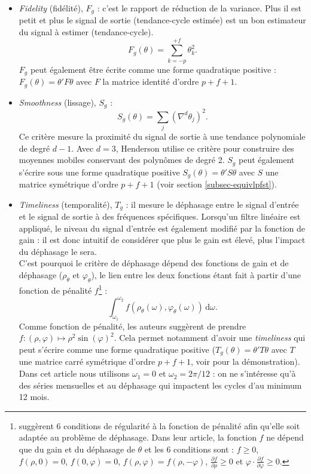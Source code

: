 \documentclass[
  12pt,
  french,
  12pt,a4paper]{article}
\newcommand\1{\mathds{1}}
\newcommand\ud{\,\mathrm{d}}
\begin{document}
\begin{itemize}
\item
  \emph{Fidelity} (fidélité), \(F_g\) : c'est le rapport de réduction de la variance.
  Plus il est petit et plus le signal de sortie (tendance-cycle estimée) est un bon estimateur du signal à estimer (tendance-cycle).
  \[
  F_g(\theta) = \sum_{k=-p}^{+f}\theta_{k}^{2}.
  \]
  \(F_g\) peut également être écrite comme une forme quadratique positive : \(F_g(\theta)=\theta'F\theta\) avec \(F\) la matrice identité d'ordre \(p+f+1\).
\item
  \emph{Smoothness} (lissage), \(S_g\) :
  \[
  S_g(\theta) = \sum_{j}(\nabla^{d}\theta_{j})^{2}.
  \]
  Ce critère mesure la proximité du signal de sortie à une tendance polynomiale de degré \(d-1\).
  Avec \(d=3\), Henderson utilise ce critère pour construire des moyennes mobiles conservant des polynômes de degré 2.
  \(S_g\) peut également s'écrire sous une forme quadratique positive \(S_g(\theta)=\theta'S\theta\) avec \(S\) une matrice symétrique d'ordre \(p+f+1\) (voir section \ref{subsec-equivlpfst}).
\item
  \emph{Timeliness} (temporalité), \(T_g\) : il mesure le déphasage entre le signal d'entrée et le signal de sortie à des fréquences spécifiques.
  Lorsqu'un filtre linéaire est appliqué, le niveau du signal d'entrée est également modifié par la fonction de gain : il est donc intuitif de considérer que plus le gain est élevé, plus l'impact du déphasage le sera.\\
  C'est pourquoi le critère de déphasage dépend des fonctions de gain et de déphasage (\(\rho_\theta\) et \(\varphi_{\theta}\)), le lien entre les deux fonctions étant fait à partir d'une fonction de pénalité \(f\)\footnote{
    \textcite{ch15HBSA} suggèrent 6 conditions de régularité à la fonction de pénalité afin qu'elle soit adaptée au problème de déphasage.
    Dans leur article, la fonction \(f\) ne dépend que du gain et du déphasage de \(\theta\) et les 6 conditions sont : \(f \geq 0\), \(f\left(\rho,0\right)=0\), \(f\left(0,\varphi\right)=0\), \(f\left(\rho,\varphi\right)=f\left(\rho,-\varphi\right)\), \(\frac{\partial f}{\partial \rho} \geq 0\) et
    \(\varphi \cdot \frac{\partial f}{\partial \varphi} \geq 0\).} :
  \[
  \int_{\omega_{1}}^{\omega_{2}}f(\rho_{\theta}(\omega),\varphi_{\theta}(\omega))\ud\omega.
  \]
  Comme fonction de pénalité, les auteurs suggèrent de prendre \(f\colon(\rho,\varphi)\mapsto\rho^2\sin(\varphi)^2\).
  Cela permet notamment d'avoir une \emph{timeliness} qui peut s'écrire comme une forme quadratique positive (\(T_g(\theta)=\theta'T\theta\) avec \(T\) une matrice carré symétrique d'ordre \(p+f+1\), voir \textcite{ch15HBSA} pour la démonstration).
  Dans cet article nous utilisons \(\omega_1=0\) et \(\omega_2=2\pi/12\) : on ne s'intéresse qu'à des séries mensuelles et au déphasage qui impactent les cycles d'au minimum 12 mois.
\end{itemize}
\end{document}
